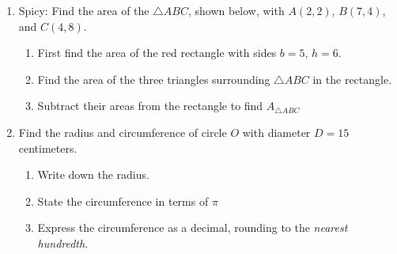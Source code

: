 \begin{enumerate}
\newpage
\item Spicy: Find the area of the $\triangle ABC$, shown below, with $A(2,2)$, $B(7,4)$, and $C(4,8)$. 
\begin{multicols}{2}
  \begin{enumerate}
    \item First find the area of the red rectangle with sides $b=5$, $h=6$.
    \item Find the area of the three triangles surrounding $\triangle ABC$ in the rectangle. 
    \item Subtract their areas from the rectangle to find $A_{\triangle ABC}$
    \end{enumerate}
    \begin{flushright}
    \end{flushright}
\end{multicols}


\newpage
\item Find the radius and circumference of circle $O$ with diameter $D=15$ centimeters.
  \begin{multicols}{2}
  \raggedcolumns
  \begin{enumerate}
    \item Write down the radius. \vspace{1.2cm}
    \item State the circumference in terms of $\pi$ \vspace{1cm}
    \item Express the circumference as a decimal, rounding to the \emph{nearest hundredth}.
  \end{enumerate}
  \columnbreak
  \end{multicols}


\end{enumerate}
